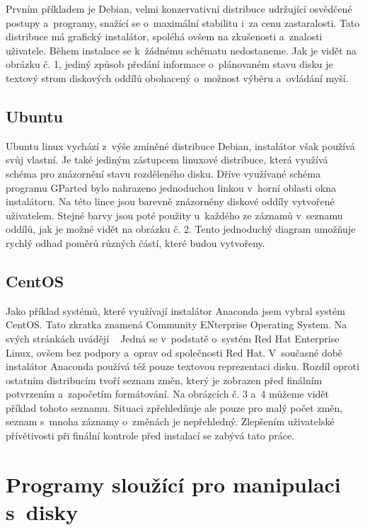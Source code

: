 \documentclass[a4paper]{article}
\begin{document}
Prvním příkladem je Debian, velmi konzervativní distribuce udržující osvědčené postupy a~programy, snažící se o~maximální stabilitu i~za cenu zastaralosti. 
Tato distribuce má grafický instalátor, spoléhá ovšem na zkušenosti a~znalosti uživatele. Během instalace se k~žádnému schématu nedostaneme. Jak je vidět na obrázku č. 1, jediný způsob předání 
informace o~plánovaném stavu disku je textový strom diskových oddílů obohacený o~možnost výběru a~ovládání myší.

\subsection{Ubuntu}

Ubuntu linux vychází z~výše zmíněné distribuce Debian, instalátor však používá svůj vlastní. Je také jediným zástupcem linuxové distribuce, která využívá  schéma 
pro znázornění stavu rozděleného disku. Dříve využívané schéma programu GParted bylo nahrazeno jednoduchou linkou v~horní oblasti okna instalátoru. Na této lince jsou barevně znázorněny diskové 
oddíly vytvořené uživatelem. Stejné barvy jsou poté použity u~každého ze záznamů v~seznamu oddílů, jak je možné vidět na obrázku č. 2. Tento jednoduchý diagram umožňuje rychlý odhad poměrů různých 
částí, které budou vytvořeny.

\subsection{CentOS}

Jako příklad systémů, které využívají instalátor Anaconda jsem vybral systém CentOS. Tato zkratka znamená Community ENterprise Operating System. Na svých stránkách uvádějí 
~\cite{CentOS} 
Jedná se v~podstatě o~systém Red Hat Enterprise Linux, ovšem bez podpory a~oprav od společnosti Red Hat. V~současné době instalátor Anaconda používá též pouze textovou 
reprezentaci disku. Rozdíl oproti ostatním distribucím tvoří seznam změn, který je zobrazen před finálním potvrzením a~započetím formátování. Na obrázcích č. 3 a~4 můžeme
vidět příklad tohoto seznamu. Situaci zpřehledňuje ale pouze pro malý počet změn, seznam s~mnoha 
záznamy o~změnách je nepřehledný. Zlepšením uživatelské přívětivosti při finální kontrole před instalací se zabývá tato práce.

\section{Programy sloužící pro manipulaci s~disky}
\end{document}
